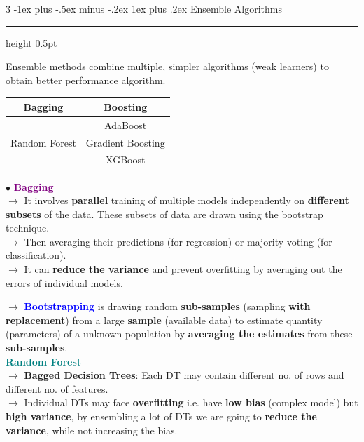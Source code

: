\documentclass[letterpaper, 10.5pt,landscape]{article}
\makeatletter
\renewcommand{\subsubsection}{\@startsection{subsubsection}{3}{0mm}%
                                {-1ex plus -.5ex minus -.2ex}%
                                {1ex plus .2ex}%
                                {\normalfont\small\bfseries}}
\makeatother
\begin{document}
\begin{multicols*}{3}
\subsubsection{Ensemble Algorithms} {\color{teal}\hrule height 0.5pt} \smallskip

Ensemble methods combine multiple, simpler algorithms (weak learners) to obtain better performance algorithm.
\vspace{-5pt}
\begin{center}
        \footnotesize
        \begin{tabular}{ c|c }
           \textbf{Bagging} & \textbf{Boosting} \\
           \hline
          & AdaBoost \\
          Random Forest & Gradient Boosting \\
          & XGBoost \\
        \end{tabular}
\end{center}
\vspace{-5pt}

$\bullet$ \textbf{\textcolor{purple}{Bagging}} \\
$\rightarrow$ It involves \textbf{parallel} training of multiple models independently on \textbf{different subsets} of the data. These subsets of data are drawn using the bootstrap technique. \\
$\rightarrow$ Then averaging their predictions (for regression) or majority voting (for classification). \\
$\rightarrow$ It can \textbf{reduce the variance} and prevent overfitting by averaging out the errors of individual models.

\vspace{3pt}
$\rightarrow$ \textbf{\textcolor{blue}{Bootstrapping}} is drawing random \textbf{sub-samples} (sampling \textbf{with replacement}) from a large \textbf{sample} (available data) to estimate quantity (parameters) of a unknown population by \textbf{averaging the estimates} from these \textbf{sub-samples}. \\









\vspace{3pt}
\textcolor{teal}{\textbf{Random Forest}} \\
$\rightarrow$\textbf{ Bagged Decision Trees}: Each DT may contain different no. of rows and different no. of features. \\
$\rightarrow$ Individual DTs may face \textbf{overfitting} i.e. have \textbf{low bias} (complex model) but \textbf{high variance}, by ensembling a lot of DTs we are going to \textbf{reduce the variance}, while not increasing the bias. \\ 


\end{multicols*}
\end{document}
